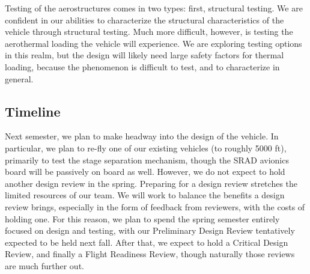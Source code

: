 Testing of the aerostructures comes in two types: first, structural testing. We are confident in our abilities to characterize the structural characteristics of the vehicle through structural testing. Much more difficult, however, is testing the aerothermal loading the vehicle will experience. We are exploring testing options in this realm, but the design will likely need large safety factors for thermal loading, because the phenomenon is difficult to test, and to characterize in general.

\subsection{Timeline}
Next semester, we plan to make headway into the design of the vehicle. In particular, we plan to re-fly one of our existing vehicles (to roughly 5000 ft), primarily to test the stage separation mechanism, though the SRAD avionics board will be passively on board as well. However, we do not expect to hold another design review in the spring. Preparing for a design review stretches the limited resources of our team. We will work to balance the benefits a design review brings, especially in the form of feedback from reviewers, with the costs of holding one. For this reason, we plan to spend the spring semester entirely focused on design and testing, with our Preliminary Design Review tentatively expected to be held next fall. After that, we expect to hold a Critical Design Review, and finally a Flight Readiness Review, though naturally those reviews are much further out.
